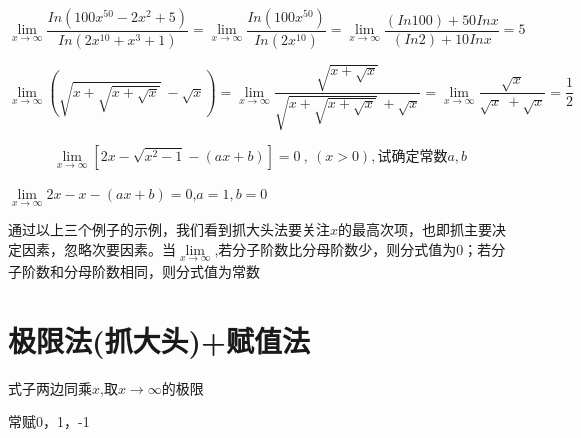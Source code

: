 \vspace*{-5pt}
\begin{equation}\label{liushufa-6}
	\lim\limits_{x\to\infty}\dfrac{In\left(100x^{50}-2x^{2}+5\right)}{In\left(2x^{10}+x^{3}+1\right)}=\lim\limits_{x\to\infty}\dfrac{In\left(100x^{50}\right)}{In\left(2x^{10}\right)}=\lim\limits_{x\to\infty}\dfrac{\left(In100\right)+50Inx}{\left(In2\right)+10Inx}=5
\end{equation} 

\vspace*{-5pt}
\begin{equation}\label{liushufa-7}
	\lim\limits_{x\to\infty}\left(\sqrt{x+\sqrt{x+\sqrt{x}}}\:-\sqrt{x}\right)=\lim\limits_{x\to\infty}\dfrac{\sqrt{x+\sqrt{x}}}{\sqrt{x+\sqrt{x+\sqrt{x}}}\:+\sqrt{x}}=\lim\limits_{x\to\infty}\dfrac{\sqrt{x}}{\sqrt{x}\:+\sqrt{x}}=\dfrac{1}{2}
\end{equation} 

\vspace*{-10pt}
\begin{equation}\label{liushufa-8}
	\lim\limits_{x\to\infty}\left\lbrack2x-\sqrt{x^{2}-1}-\left(ax+b\right)\right\rbrack=0\:,\:\left(x>0\right),试确定常数a,b
\end{equation}



\begin{center}
	\vspace{-10pt}
	
	 \hspace{1em}	$\lim\limits_{x\to\infty}2x-x-\left(ax+b\right)=0$,$a=1,b=0$
\end{center}

通过以上三个例子的示例，我们看到抓大头法要关注$x$的最高次项，也即抓主要决定因素，忽略次要因素。当$\lim\limits_{x\to\infty}$,若分子阶数比分母阶数少，则分式值为0；若分子阶数和分母阶数相同，则分式值为常数

\section{极限法(抓大头)+赋值法}

 \hspace{0.5em} 式子两边同乘$x$,取$x\rightarrow\infty$的极限

\vspace{5pt}

 \hspace{0.5em} 常赋0，1，-1

